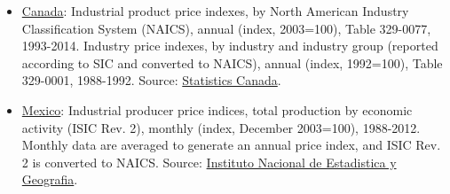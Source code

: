 \begin{spacing}{1}
\begin{itemize}
	\item \underline{Canada}: Industrial product price indexes, by North American Industry Classification System (NAICS), annual (index, 2003=100), Table 329-0077, 1993-2014. Industry price indexes, by industry and industry group (reported according to SIC and converted to NAICS), annual (index, 1992=100), Table 329-0001, 1988-1992. Source: \href{http://www5.statcan.gc.ca/cansim/a47}{Statistics Canada}. %

	\item \underline{Mexico}: Industrial producer price indices, total production by economic activity (ISIC Rev. 2), monthly (index, December 2003=100), 1988-2012. Monthly data are averaged to generate an annual price index, and ISIC Rev. 2 is converted to NAICS. Source: \href{http://www.inegi.org.mx/est/contenidos/proyectos/inp/INPP_CAB2003.aspx}{Instituto Nacional de Estadistica y Geografia}. %
	
	\end{itemize}


	
	
	

\end{spacing}
